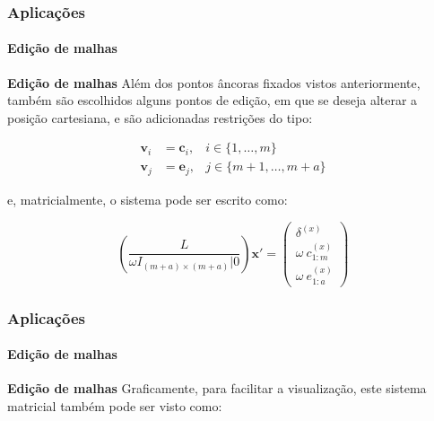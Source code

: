 \begin{frame}
	\frametitle{{\bf \color{blue} Aplicações}}
	\framesubtitle{\color{blue} Edição de malhas}
	
	\begin{block}{\bf Edição de malhas}
		Além dos pontos âncoras fixados vistos anteriormente, também são escolhidos alguns pontos de edição, em que se deseja alterar a posição cartesiana, e são adicionadas restrições do tipo:
		
		\begin{align}
			\mathbf{v}_i &= \mathbf{c}_i, &i \in \{1, \dots, m\}\\
			\mathbf{v}_j &= \mathbf{e}_j, &j \in \{m+1, \dots, m+a\}
		\end{align}
		
		\noindent e, matricialmente, o sistema pode ser escrito como:
		
		\begin{equation}\label{eq:sisrecoveredi}
			\left( \frac{L}{\omega I_{(m+a) \times (m+a)} | 0} \right) \mathbf{x'} = \begin{pmatrix}
				\delta^{(x)}\\
				\omega\ c_{1:m}^{(x)}\\
				\omega\ e_{1:a}^{(x)}
			\end{pmatrix}
		\end{equation}
	\end{block}
	
\end{frame}


\begin{frame}
	\frametitle{{\bf \color{blue} Aplicações}}
	\framesubtitle{\color{blue} Edição de malhas}
	
	\begin{block}{\bf Edição de malhas}
		Graficamente, para facilitar a visualização, este sistema matricial também pode ser visto como:
		
		\begin{center}
		\end{center}
	\end{block}
	
\end{frame}

